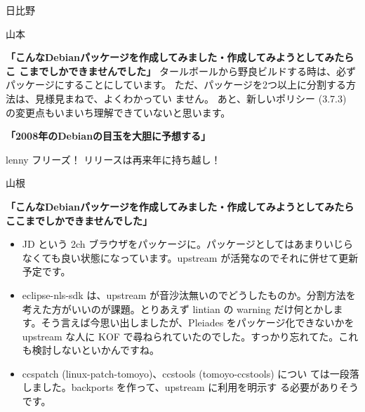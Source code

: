 \documentclass[cjk,dvipdfmx,12pt]{beamer}
\begin{document}
\begin{frame}{日比野}
\end{frame}\begin{frame}{山本}

\textbf{「こんなDebianパッケージを作成してみました・作成してみようとしてみたらこ
こまでしかできませんでした」}
タールボールから野良ビルドする時は、必ずパッケージにすることにしています。
ただ、パッケージを2つ以上に分割する方法は、見様見まねで、よくわかってい
ません。
あと、新しいポリシー (3.7.3) の変更点もいまいち理解できていないと思います。

\textbf{「2008年のDebianの目玉を大胆に予想する」}

lenny フリーズ！
リリースは再来年に持ち越し！


\end{frame}\begin{frame}{山根}

\textbf{「こんなDebianパッケージを作成してみました・作成してみようとしてみたらここまでしかできませんでした」}

\begin{itemize}
 
 \item  JD という 2ch ブラウザをパッケージに。パッケージとしてはあまりいじらなくても良い状態になっています。upstream が活発なのでそれに併せて更新予定です。
 \item  eclipse-nls-sdk は、upstream が音沙汰無いのでどうしたものか。分割方法を考えた方がいいのが課題。とりあえず lintian の warning だけ何とかします。そう言えば今思い出しましたが、Pleiades をパッケージ化できないかを upstream な人に KOF で尋ねられていたのでした。すっかり忘れてた。これも検討しないといかんですね。
 \item  ccspatch (linux-patch-tomoyo)、ccstools (tomoyo-ccstools) につい
	ては一段落しました。backports を作って、upstream に利用を明示す
	る必要がありそうです。
\end{itemize}
\end{frame}
\end{document}
